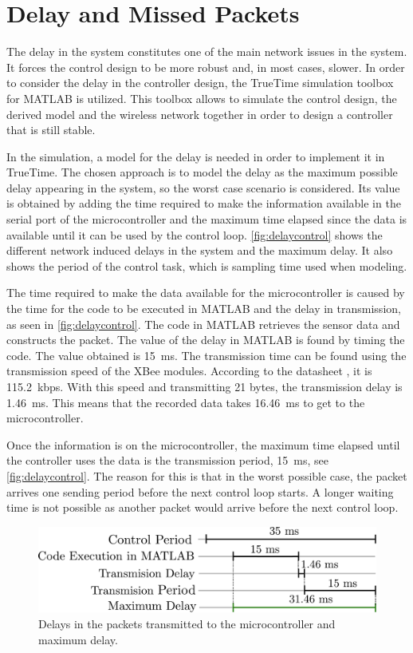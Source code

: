 \section{Delay and Missed Packets}
The delay in the system constitutes one of the main network issues in the system. It forces the control design to be more robust and, in most cases, slower. In order to consider the delay in the controller design, the TrueTime simulation toolbox for MATLAB is utilized. This toolbox allows to simulate the control design, the derived model and the wireless network together in order to design a controller that is still stable.

In the simulation, a model for the delay is needed in order to implement it in TrueTime. The chosen approach is to model the delay as the maximum possible delay appearing in the system, so the worst case scenario is considered. Its value is obtained by adding the time required to make the information available in the serial port of the microcontroller and the maximum time elapsed since the data is available until it can be used by the control loop. \autoref{fig:delaycontrol} shows the different network induced delays in the system and the maximum delay. It also shows the period of the control task, which is sampling time used when modeling.

The time required to make the data available for the microcontroller is caused by the time for the code to be executed in MATLAB and the delay in transmission, as seen in \autoref{fig:delaycontrol}. The code in MATLAB retrieves the sensor data and constructs the packet. The value of the delay in MATLAB is found by timing the code. The value obtained is \SI{15}{ms}. The transmission time can be found using the transmission speed of the XBee modules. According to the datasheet \cite{XBee}, it is \SI{115.2}{kbps}. With this speed and transmitting 21 bytes, the transmission delay is \SI{1.46}{ms}. This means that the recorded data takes \SI{16.46}{ms} to get to the microcontroller.

Once the information is on the microcontroller, the maximum time elapsed until the controller uses the data is the transmission period, \SI{15}{ms}, see \autoref{fig:delaycontrol}. The reason for this is that in the worst possible case, the packet arrives one sending period before the next control loop starts. A longer waiting time is not possible as another packet would arrive before the next control loop.
 
\begin{figure}[H]
	\centering
	\includegraphics[width=.6\textwidth]{figures/maxDelay.pdf}
	\caption{Delays in the packets transmitted to the microcontroller and maximum delay.}
	\label{fig:delaycontrol}
\end{figure}

